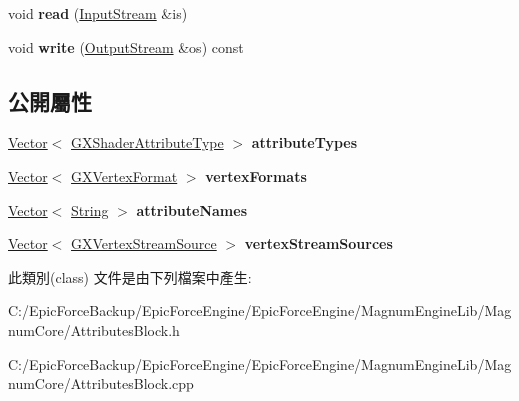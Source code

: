 \begin{DoxyCompactItemize}
\item 
void {\bfseries read} (\hyperlink{class_magnum_1_1_input_stream}{Input\+Stream} \&is)\hypertarget{class_magnum_1_1_attributes_block_ae702579994fbe5527bfd207e11da4efc}{}\label{class_magnum_1_1_attributes_block_ae702579994fbe5527bfd207e11da4efc}

\item 
void {\bfseries write} (\hyperlink{class_magnum_1_1_output_stream}{Output\+Stream} \&os) const \hypertarget{class_magnum_1_1_attributes_block_a0c573cc33e9401bd68504ec3ef95e636}{}\label{class_magnum_1_1_attributes_block_a0c573cc33e9401bd68504ec3ef95e636}

\end{DoxyCompactItemize}
\subsection*{公開屬性}
\begin{DoxyCompactItemize}
\item 
\hyperlink{class_magnum_1_1_vector}{Vector}$<$ \hyperlink{class_magnum_1_1_g_x_shader_attribute_type}{G\+X\+Shader\+Attribute\+Type} $>$ {\bfseries attribute\+Types}\hypertarget{class_magnum_1_1_attributes_block_a0a6de9accd00483042e40a0f3accb03a}{}\label{class_magnum_1_1_attributes_block_a0a6de9accd00483042e40a0f3accb03a}

\item 
\hyperlink{class_magnum_1_1_vector}{Vector}$<$ \hyperlink{class_magnum_1_1_g_x_vertex_format}{G\+X\+Vertex\+Format} $>$ {\bfseries vertex\+Formats}\hypertarget{class_magnum_1_1_attributes_block_af9d8278a993f4f6878eaab36da9801f3}{}\label{class_magnum_1_1_attributes_block_af9d8278a993f4f6878eaab36da9801f3}

\item 
\hyperlink{class_magnum_1_1_vector}{Vector}$<$ \hyperlink{class_magnum_1_1_string}{String} $>$ {\bfseries attribute\+Names}\hypertarget{class_magnum_1_1_attributes_block_a1b55aa5ca029c825ae1859ae12239082}{}\label{class_magnum_1_1_attributes_block_a1b55aa5ca029c825ae1859ae12239082}

\item 
\hyperlink{class_magnum_1_1_vector}{Vector}$<$ \hyperlink{class_magnum_1_1_g_x_vertex_stream_source}{G\+X\+Vertex\+Stream\+Source} $>$ {\bfseries vertex\+Stream\+Sources}\hypertarget{class_magnum_1_1_attributes_block_a38c1e2575a44a93230f2343baef2793b}{}\label{class_magnum_1_1_attributes_block_a38c1e2575a44a93230f2343baef2793b}

\end{DoxyCompactItemize}


此類別(class) 文件是由下列檔案中產生\+:\begin{DoxyCompactItemize}
\item 
C\+:/\+Epic\+Force\+Backup/\+Epic\+Force\+Engine/\+Epic\+Force\+Engine/\+Magnum\+Engine\+Lib/\+Magnum\+Core/Attributes\+Block.\+h\item 
C\+:/\+Epic\+Force\+Backup/\+Epic\+Force\+Engine/\+Epic\+Force\+Engine/\+Magnum\+Engine\+Lib/\+Magnum\+Core/Attributes\+Block.\+cpp\end{DoxyCompactItemize}
